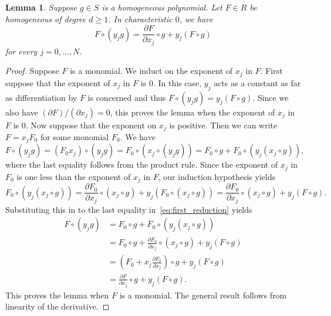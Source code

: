 \documentclass[12pt, reqno]{amsart}
\numberwithin{equation}{section}
\theoremstyle{plain} %
\newtheorem{lem}[thm]{Lemma}
\theoremstyle{definition}
\theoremstyle{remark}
\begin{document}
\begin{lem}\label{lem:prodrulechar0}
Suppose $g\in S$ is a homogeneous polynomial.  Let $F\in R$ be homogeneous of degree $d\geq 1$.  In characteristic $0$, we have
\[
F\circ (y_jg) = \frac{\partial F}{\partial x_j}\circ g + y_j\left(F\circ g\right)
\]
for every $j=0,\ldots,N$.
\end{lem}
\begin{proof}
Suppose $F$ is a monomial.  We induct on the exponent of $x_j$ in $F$.  First suppose that the exponent of $x_j$ in $F$ is $0$.  In this case, $y_j$ acts as a constant as far as differentiation by $F$ is concerned and thus
$
F\circ(y_jg)=y_j(F\circ g).
$
Since we also have $(\partial F)/(\partial x_j)=0$, this proves the lemma when the exponent of $x_j$ in $F$ is $0$.  Now suppose that the exponent on $x_j$ is positive.  Then we can write $F=x_jF_0$ for some monomial $F_0$.  We have
\begin{equation}\label{eq:first_reduction}
F\circ (y_jg)=(F_0x_j)\circ(y_jg)=F_0\circ (x_j\circ (y_jg))=F_0\circ g+F_0\circ (y_j(x_j\circ g)),
\end{equation}
where the last equality follows from the product rule.  Since the exponent of $x_j$ in $F_0$ is one less than the exponent of $x_j$ in $F$, our induction hypothesis yields
\[
F_0\circ(y_j(x_j\circ g))=\frac{\partial F_0}{\partial x_j}\circ (x_j\circ g)+y_j(F_0\circ (x_j\circ g))=\frac{\partial F_0}{\partial x_j}\circ (x_j\circ g)+y_j(F\circ g).
\]
Substituting this in to the last equality in~\eqref{eq:first_reduction} yields
\begin{align*}
F\circ (y_jg) & =F_0\circ g+F_0\circ (y_j(x_j\circ g))\\
&=F_0\circ g+\frac{\partial F_0}{\partial x_j}\circ (x_j\circ g)+y_j(F\circ g)\\
& =\left(F_0+x_j\frac{\partial F_0}{\partial x_j}\right)\circ g+y_j(F\circ g)\\
& = \frac{\partial F}{\partial x_j}\circ g+y_j(F\circ g).
\end{align*}
This proves the lemma when $F$ is a monomial.  The general result follows from linearity of the derivative.
\end{proof}
\end{document}
